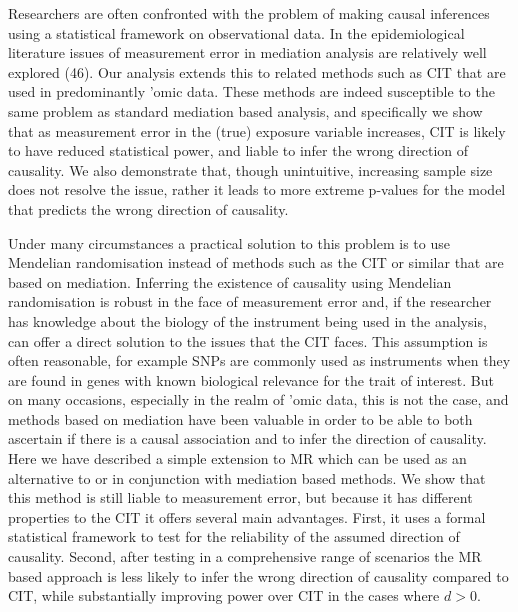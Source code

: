 \documentclass[]{article}
\begin{document}
Researchers are often confronted with the problem of making causal
inferences using a statistical framework on observational data. In the
epidemiological literature issues of measurement error in mediation
analysis are relatively well explored (46). Our analysis extends this to
related methods such as CIT that are used in predominantly 'omic data.
These methods are indeed susceptible to the same problem as standard
mediation based analysis, and specifically we show that as measurement
error in the (true) exposure variable increases, CIT is likely to have
reduced statistical power, and liable to infer the wrong direction of
causality. We also demonstrate that, though unintuitive, increasing
sample size does not resolve the issue, rather it leads to more extreme
p-values for the model that predicts the wrong direction of causality.

Under many circumstances a practical solution to this problem is to use
Mendelian randomisation instead of methods such as the CIT or similar
that are based on mediation. Inferring the existence of causality using
Mendelian randomisation is robust in the face of measurement error and,
if the researcher has knowledge about the biology of the instrument
being used in the analysis, can offer a direct solution to the issues
that the CIT faces. This assumption is often reasonable, for example
SNPs are commonly used as instruments when they are found in genes with
known biological relevance for the trait of interest. But on many
occasions, especially in the realm of 'omic data, this is not the case,
and methods based on mediation have been valuable in order to be able to
both ascertain if there is a causal association and to infer the
direction of causality. Here we have described a simple extension to MR
which can be used as an alternative to or in conjunction with mediation
based methods. We show that this method is still liable to measurement
error, but because it has different properties to the CIT it offers
several main advantages. First, it uses a formal statistical framework
to test for the reliability of the assumed direction of causality.
Second, after testing in a comprehensive range of scenarios the MR based
approach is less likely to infer the wrong direction of causality
compared to CIT, while substantially improving power over CIT in the
cases where \(d > 0\).
\end{document}
